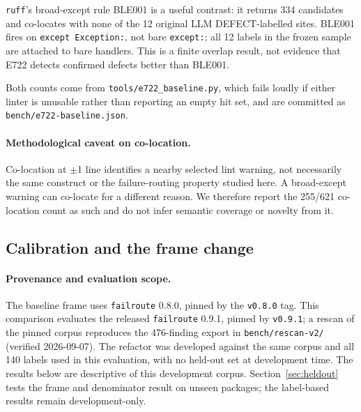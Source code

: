 \documentclass[10pt,a4paper]{article}
\begin{document}
\texttt{ruff}'s broad-except rule BLE001 is a useful contrast: it returns 334
candidates and co-locates with none of the 12 original LLM DEFECT-labelled
sites. BLE001 fires on \texttt{except Exception:}, not bare \texttt{except:};
all 12 labels in the frozen sample are attached to bare handlers. This is a
finite overlap result, not evidence that E722 detects confirmed defects better
than BLE001.

Both counts come from \texttt{tools/e722\_baseline.py}, which fails loudly if
either linter is unusable rather than reporting an empty hit set, and are
committed as \texttt{bench/e722-baseline.json}.

\paragraph{Methodological caveat on co-location.}
Co-location at $\pm$1 line identifies a nearby selected lint warning,
not necessarily the same construct or the failure-routing property studied here. A broad-except warning can co-locate for a different
reason. We therefore report the 255/621 co-location count as such and do not
infer semantic coverage or novelty from it.

\subsection{Calibration and the frame change}
\label{sec:rq5}

\paragraph{Provenance and evaluation scope.}
The baseline frame uses \texttt{failroute} 0.8.0,
pinned by the \texttt{v0.8.0} tag. This comparison evaluates the released
\texttt{failroute} 0.9.1, pinned by \texttt{v0.9.1}; a rescan of the pinned corpus reproduces the
476-finding export in \texttt{bench/rescan-v2/} (verified 2026-09-07). The refactor
was developed against the same corpus and all 140 labels used in this evaluation,
with no held-out set at development time. The results below are descriptive of
this development corpus. Section~\ref{sec:heldout} tests the frame and
denominator result on unseen packages; the label-based results remain
development-only.
\end{document}
